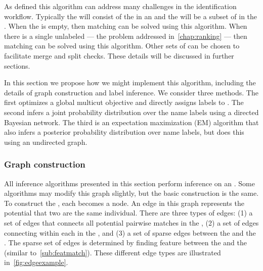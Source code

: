        As defined this algorithm can address many challenges in the
          identification workflow.
        Typically the \uset{} will consist of the \annots{} in an
          \occurrence{} and the \lset{} will be a subset of \exemplars{} in the
          \masterdatabase{}.
        When the \masterdatabase{} is empty, then \intraoccurrence{} matching
          can be solved using this algorithm.
        When there is a single unlabeled \annot{} --- the problem addressed
          in~\cref{chap:ranking} --- then \vsexemplar{} matching can be solved
          using this algorithm.
        Other sets of \annots{} can be chosen to facilitate merge and split
          checks.
        These details will be discussed in further sections.

        In this section we propose how we might implement this algorithm,
          including the details of graph construction and label inference.
        We consider three methods.
        The first optimizes a global multicut objective and directly assigns
          labels to \annots{}.
        The second infers a joint probability distribution over the name
          labels using a directed Bayesian network.
        The third is an expectation maximization (EM) algorithm that also
          infers a posterior probability distribution over name labels, but does
          this using an undirected graph.

        \subsubsection{Graph construction}

            All inference algorithms presented in this section perform
              inference on an \glossterm{\idengraph{}}.
            Some algorithms may modify this graph slightly, but the basic
              construction is the same.
            To construct the \idengraph{}, each \annot{} becomes a node.
            An edge in this graph represents the potential that two \annots{}
              are the same individual.
            There are three types of edges:
            (1) a set of edges that connects all potential pairwise matches in
              the \uset{},
            (2) a set of edges connecting \annots{} within each \name{} in the
              \lset{}, and %
            (3) a set of sparse edges between the \uset{} and the \lset{}.
            The sparse set of edges is determined by finding feature
              \correspondences{} between the \uset{} and the \lset{} (similar
              to~\cref{sub:featmatch}).
            These different edge types are illustrated
              in~\cref{fig:edgeexample}.

